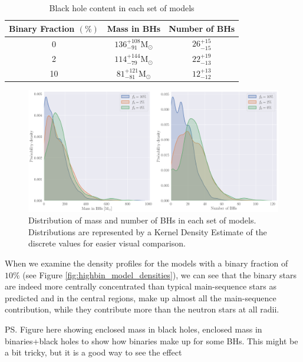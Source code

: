\begin{table}
	\centering
	\caption{Black hole content in each set of models}
	\begin{tabular}{c c c}
		\hline
		Binary Fraction $(\%)$ & Mass in BHs                         & Number of BHs    \\
		\hline
		0                      & $136^{+108}_{-91} \mathrm{M}_\odot$ & $26^{+15}_{-15}$ \\
		2                      & $114^{+144}_{-79} \mathrm{M}_\odot$ & $22^{+19}_{-13}$ \\
		10                     & $81 ^{+121}_{-81} \mathrm{M}_\odot$ & $12^{+13}_{-12}$ \\
		\hline
	\end{tabular}
	\label{tab:BH_contents}
\end{table}


\begin{figure}
	\centering
	\includegraphics[width=\textwidth]{figures/BH_KDEs.png}
	\caption{Distribution of mass and number of BHs in each set of models. Distributions are
		represented by a Kernel Density Estimate of the discrete values for easier visual
		comparison.}
	\label{fig:BH_KDEs}
\end{figure}

When we examine the density profiles for the models with a binary fraction of $10\%$ (see Figure
\ref{fig:highbin_model_densities}), we can see that the binary stars are indeed more centrally
concentrated than typical main-sequence stars as predicted and in the central regions, make up
almost all the main-sequence contribution, while they contribute more than the neutron stars at all
radii.

\ps{Figure here showing enclosed mass in black holes, enclosed mass in binaries+black holes to show
	how binaries make up for some BHs. This might be a bit tricky, but it is a good way to see
	the effect}


